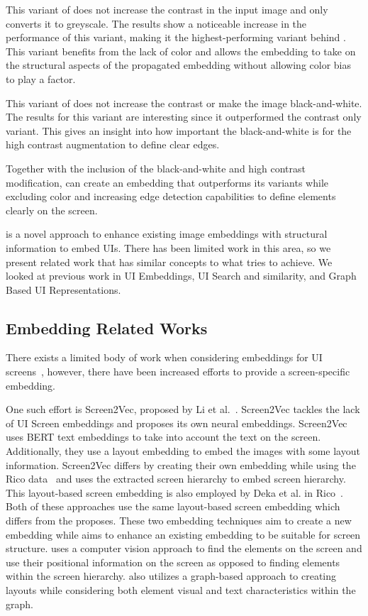 This variant of \FRAME does not increase the contrast in the input image and only converts it to greyscale. The results show a noticeable increase in the performance of this variant, making it the highest-performing variant behind \FRAME. This variant benefits from the lack of color and allows the embedding to take on the structural aspects of the propagated embedding without allowing color bias to play a factor. 

This variant of \FRAME does not increase the contrast or make the image black-and-white. The results for this variant are interesting since it outperformed the contrast only variant. This gives an insight into how important the black-and-white is for the high contrast augmentation to define clear edges. 

Together with the inclusion of the black-and-white and high contrast modification, \FRAME can create an embedding that outperforms its variants while excluding color and increasing edge detection capabilities to define elements clearly on the screen. 


\FRAME is a novel approach to enhance existing image embeddings with structural information to embed UIs. There has been limited work in this area, so we present related work that has similar concepts to what \FRAME tries to achieve. We looked at previous work in UI Embeddings, UI Search and similarity, and Graph Based UI Representations. 

\subsection{Embedding Related Works}
There exists a limited body of work when considering embeddings for UI screens~\cite{Li21}, however, there have been increased efforts to provide a screen-specific embedding. 

One such effort is Screen2Vec, proposed by Li et al.~\cite{Li21}. Screen2Vec tackles the lack of UI Screen embeddings and proposes its own neural embeddings. Screen2Vec uses BERT text embeddings to take into account the text on the screen. Additionally, they use a layout embedding to embed the images with some layout information. Screen2Vec differs by creating their own embedding while using the Rico data~\cite{Rico} and uses the extracted screen hierarchy to embed screen hierarchy. This layout-based screen embedding is also employed by Deka et al. in Rico~\cite{Rico}. Both of these approaches use the same layout-based screen embedding which differs from the \FRAME proposes. These two embedding techniques aim to create a new embedding while \FRAME aims to enhance an existing embedding to be suitable for screen structure. 
\FRAME uses a computer vision approach to find the elements on the screen and use their positional information on the screen as opposed to finding elements within the screen hierarchy. \FRAME also utilizes a graph-based approach to creating layouts while considering both element visual and text characteristics within the graph. 

